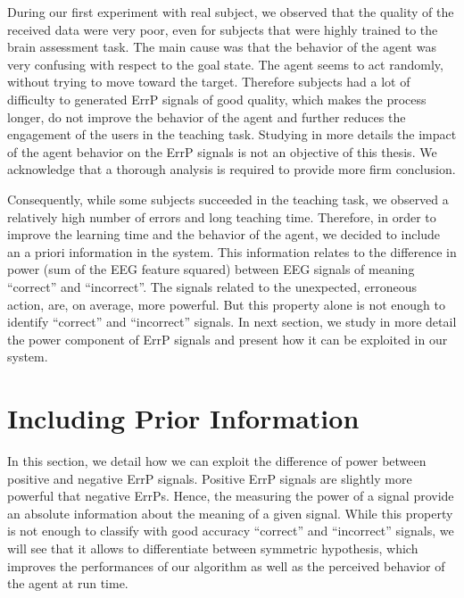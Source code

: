 During our first experiment with real subject, we observed that the quality of the received data were very poor, even for subjects that were highly trained to the brain assessment task. The main cause was that the behavior of the agent was very confusing with respect to the goal state. The agent seems to act randomly, without trying to move toward the target. Therefore subjects had a lot of difficulty to generated ErrP signals of good quality, which makes the process longer, do not improve the behavior of the agent and further reduces the engagement of the users in the teaching task. Studying in more details the impact of the agent behavior on the ErrP signals is not an objective of this thesis. We acknowledge that a thorough analysis is required to provide more firm conclusion.

Consequently, while some subjects succeeded in the teaching task, we observed a relatively high number of errors and long teaching time. Therefore, in order to improve the learning time and the behavior of the agent, we decided to include an a priori information in the system. This information relates to the difference in power (sum of the EEG feature squared) between EEG signals of meaning ``correct'' and ``incorrect''. The signals related to the unexpected, erroneous action, are, on average, more powerful. But this property alone is not enough to identify ``correct'' and ``incorrect'' signals. In next section, we study in more detail the power component of ErrP signals and present how it can be exploited in our system.

\section{Including Prior Information}
\label{chapter:bci:priorpower}

In this section, we detail how we can exploit the difference of power between positive and negative ErrP signals. Positive ErrP signals are slightly more powerful that negative ErrPs. Hence, the measuring the power of a signal provide an absolute information about the meaning of a given signal. While this property is not enough to classify with good accuracy ``correct'' and ``incorrect'' signals, we will see that it allows to differentiate between symmetric hypothesis, which improves the performances of our algorithm as well as the perceived behavior of the agent at run time.

